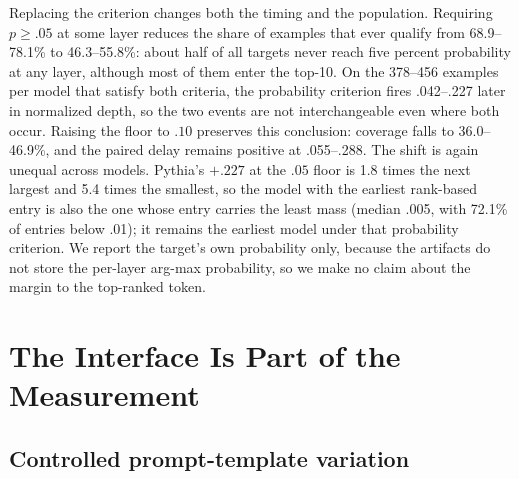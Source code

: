 \documentclass[11pt]{article}
\begin{document}
Replacing the criterion changes both the timing and the population. Requiring $p\ge.05$ at some layer reduces the share of examples that ever qualify from 68.9--78.1\% to 46.3--55.8\%: about half of all targets never reach five percent probability at any layer, although most of them enter the top-10. On the 378--456 examples per model that satisfy both criteria, the probability criterion fires .042--.227 later in normalized depth, so the two events are not interchangeable even where both occur. Raising the floor to $.10$ preserves this conclusion: coverage falls to 36.0--46.9\%, and the paired delay remains positive at .055--.288. The shift is again unequal across models. Pythia's $+.227$ at the $.05$ floor is 1.8 times the next largest and 5.4 times the smallest, so the model with the earliest rank-based entry is also the one whose entry carries the least mass (median .005, with 72.1\% of entries below .01); it remains the earliest model under that probability criterion. We report the target's own probability only, because the artifacts do not store the per-layer arg-max probability, so we make no claim about the margin to the top-ranked token.

\begin{table}[t]
\centering
\resizebox{\columnwidth}{!}{%

}
\caption{Rank criterion versus probability criterion on 817 TruthfulQA examples. Median $p$ is the median target probability at the rank-based first entry, and the next column gives the percentage of those entries below one percent. Cover is the percentage of all examples that ever reach probability $.05$. Paired $\Delta$ is the mean depth difference between the two criteria on the examples that satisfy both, so it is a within-example comparison. Rows are ordered by $\Delta$.}
\label{tab:probability}
\end{table}

\section{The Interface Is Part of the Measurement}
\subsection{Controlled prompt-template variation}
\begin{table}[t]
\centering\small
{}
\caption{Qwen2.5-7B on the same 817 TruthfulQA questions and targets under three prompt templates (percent except normalized depths).}
\label{tab:prompts}
\end{table}
\end{document}
